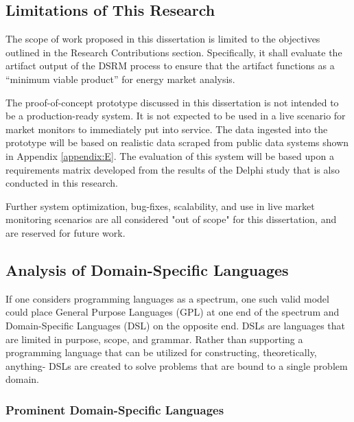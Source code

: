 \subsection{Limitations of This Research}

The scope of work proposed in this dissertation is limited to the objectives outlined in the Research Contributions section. Specifically, it shall evaluate the artifact output of the DSRM process to ensure that the artifact functions as a “minimum viable product” for energy market analysis.

The proof-of-concept prototype discussed in this dissertation is not intended to be a production-ready system. It is not expected to be used in a live scenario for market monitors to immediately put into service. The data ingested into the prototype will be based on realistic data scraped from public data systems shown in Appendix \ref{appendix:E}. The evaluation of this system will be based upon a requirements matrix developed from the results of the Delphi study that is also conducted in this research.

Further system optimization, bug-fixes, scalability, and use in live market monitoring scenarios are all considered "out of scope" for this dissertation, and are reserved for future work.

\subsection{Analysis of Domain-Specific Languages}

If one considers programming languages as a spectrum, one such valid model could place General Purpose Languages (GPL) at one end of the spectrum and Domain-Specific Languages (DSL) on the opposite end. DSLs are languages that are limited in purpose, scope, and grammar. Rather than supporting a programming language that can be utilized for constructing, theoretically, anything- DSLs are created to solve problems that are bound to a single problem domain.

\subsubsection{Prominent Domain-Specific Languages}

